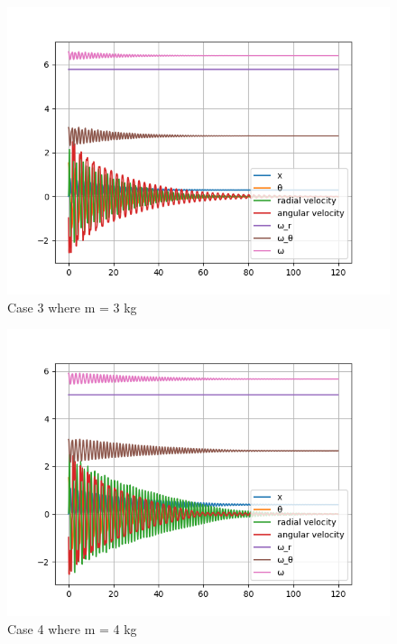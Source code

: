 \begin{figure}[H]
    \centering
    \includegraphics[width=15cm]{ExpPictures/m3.png}
    \caption{{Case 3 where m = 3 kg}}
    \label{}
\end{figure}
        
\begin{figure}[H]
    \centering
    \includegraphics[width=15cm]{ExpPictures/m4.png}
    \caption{{Case 4 where m = 4 kg}}
    \label{}
\end{figure}
        
